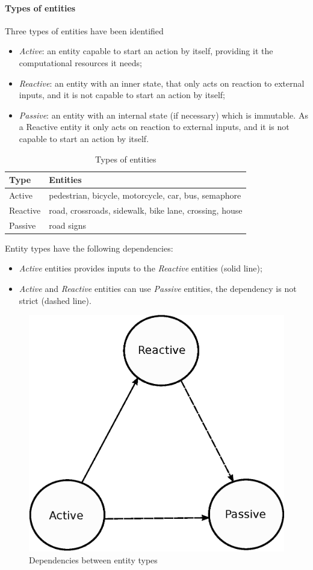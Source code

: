\paragraph{Types of entities}
Three types of entities have been identified
\begin{itemize}
  \item \textit{Active}: an entity capable to start an action by itself, 
  providing it the computational resources it needs;
  \item \textit{Reactive}: an entity with an inner state, that only acts on reaction to external inputs, 
  and it is not capable to start an action by itself;
  \item \textit{Passive}: an entity with an internal state (if necessary) which is immutable. 
   As a Reactive entity it only acts on reaction to external inputs, and it is not capable to start an action by itself.
\end{itemize}
\begin{table}[H]
\centering
\begin{tabular}{|l|l|}
\hline
\rowcolor{BlueGreen}
Type     & Entities                                 \\ \hline
Active   & pedestrian, bicycle, motorcycle, car, bus, semaphore \\ \hline
Reactive & road, crossroads, sidewalk, bike lane, crossing, house \\ \hline
Passive  & road signs                               \\ \hline
\end{tabular}
\caption{Types of entities}
\label{tab:entity_type}
\end{table}
Entity types have the following dependencies:
\begin{itemize}
  \item \textit{Active} entities provides inputs to the \textit{Reactive} entities (solid line);
  \item \textit{Active} and \textit{Reactive} entities can use \textit{Passive} entities, the dependency is not strict (dashed line).
\end{itemize}
\begin{figure}[H]
  \centering
  \includegraphics[width=.35\columnwidth]{sections/images/solution/entity_type_dependency.eps}
  \caption{Dependencies between entity types}
  \label{fig:sd-entity-types-deps}
\end{figure}
